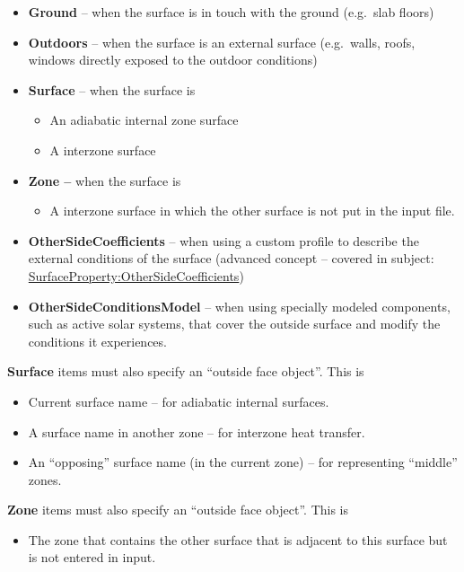 \begin{itemize}
\item
  \textbf{Ground} -- when the surface is in touch with the ground (e.g.~slab floors)
\item
  \textbf{Outdoors} -- when the surface is an external surface (e.g.~walls, roofs, windows directly exposed to the outdoor conditions)
\item
  \textbf{Surface} -- when the surface is
  \begin{itemize}
    \item
      An adiabatic internal zone surface
    \item
      A interzone surface
  \end{itemize}
\item
  \textbf{Zone --} when the surface is
  \begin{itemize}
    \item
      A interzone surface in which the other surface is not put in the input file.
  \end{itemize}
\item
  \textbf{OtherSideCoefficients} -- when using a custom profile to describe the external conditions of the surface (advanced concept -- covered in subject: \hyperref[surfacepropertyothersidecoefficients]{SurfaceProperty:OtherSideCoefficients})
\item
  \textbf{OtherSideConditionsModel} -- when using specially modeled components, such as active solar systems, that cover the outside surface and modify the conditions it experiences.
\end{itemize}

\textbf{Surface} items must also specify an ``outside face object''. This is

\begin{itemize}
\tightlist
\item
  Current surface name -- for adiabatic internal surfaces.
\item
  A surface name in another zone -- for interzone heat transfer.
\item
  An ``opposing'' surface name (in the current zone) -- for representing ``middle'' zones.
\end{itemize}

\textbf{Zone} items must also specify an ``outside face object''. This is

\begin{itemize}
\tightlist
\item
  The zone that contains the other surface that is adjacent to this surface but is not entered in input.
\end{itemize}

